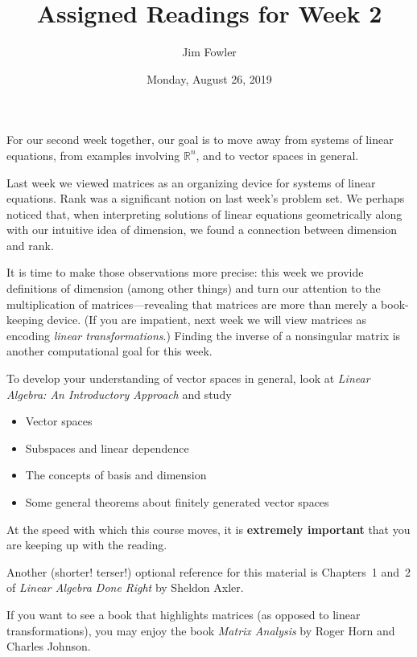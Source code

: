 \documentclass{homework}
\author{Jim Fowler}
\title{Assigned Readings for Week 2}
\date{Monday, August 26, 2019}
\begin{document}
\maketitle

For our second week together, our goal is to move away from systems of
linear equations, from examples involving $\mathbb{R}^n$, and to vector
spaces in general.

Last week we viewed matrices as an organizing device for systems of
linear equations.  Rank was a significant notion on last week's
problem set.  We perhaps noticed that, when interpreting solutions of
linear equations geometrically along with our intuitive idea of
dimension, we found a connection between dimension and rank.

It is time to make those observations more precise: this week we
provide definitions of dimension (among other things) and turn our
attention to the multiplication of matrices---revealing that matrices
are more than merely a book-keeping device.  (If you are impatient,
next week we will view matrices as encoding \textit{linear
  transformations}.)  Finding the inverse of a nonsingular matrix is
another computational goal for this week.

To develop your understanding of vector spaces in general, look at
\textit{Linear Algebra: An Introductory Approach} and study
\begin{itemize}
\item {} Vector spaces
\item {} Subspaces and linear dependence
\item {} The concepts of basis and dimension
\item {} Some general theorems about finitely generated vector spaces
\end{itemize}
At the speed with which this course moves, it is \textbf{extremely
  important} that you are keeping up with the reading.

Another (shorter!  terser!) optional reference for this material is
Chapters~1 and~2 of \textit{Linear Algebra Done Right} by Sheldon
Axler.

If you want to see a book that highlights matrices (as opposed to
linear transformations), you may enjoy the book \textit{Matrix
  Analysis} by Roger Horn and Charles Johnson.
\end{document}
